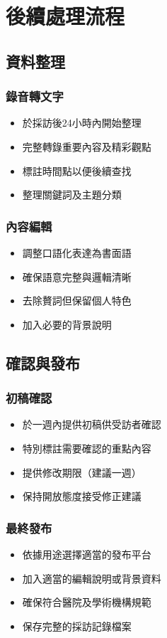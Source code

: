 \documentclass[12pt,a4paper]{article}
\begin{document}
\section{後續處理流程}

\subsection{資料整理}
\subsubsection{錄音轉文字}
\begin{itemize}[nosep]
    \item 於採訪後24小時內開始整理
    \item 完整轉錄重要內容及精彩觀點
    \item 標註時間點以便後續查找
    \item 整理關鍵詞及主題分類
\end{itemize}

\subsubsection{內容編輯}
\begin{itemize}[nosep]
    \item 調整口語化表達為書面語
    \item 確保語意完整與邏輯清晰
    \item 去除贅詞但保留個人特色
    \item 加入必要的背景說明
\end{itemize}

\subsection{確認與發布}
\subsubsection{初稿確認}
\begin{itemize}[nosep]
    \item 於一週內提供初稿供受訪者確認
    \item 特別標註需要確認的重點內容
    \item 提供修改期限（建議一週）
    \item 保持開放態度接受修正建議
\end{itemize}

\subsubsection{最終發布}
\begin{itemize}[nosep]
    \item 依據用途選擇適當的發布平台
    \item 加入適當的編輯說明或背景資料
    \item 確保符合醫院及學術機構規範
    \item 保存完整的採訪記錄檔案
\end{itemize}
\end{document}
